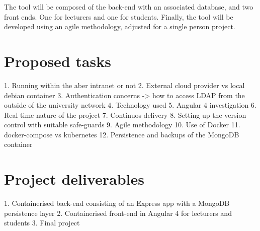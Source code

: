 \documentclass[11pt,fleqn,twoside]{article}
\begin{document}
The tool will be composed of the back-end with an associated database, and two
front ends. One for lecturers and one for students. Finally, the tool will be
developed using an agile methodology, adjusted for a single person project.

\section{Proposed tasks}
1. Running within the aber intranet or not
2. External cloud provider vs local debian container
3. Authentication concerns -> how to access LDAP from the outside of the university network
4. Technology used
5. Angular 4 investigation
6. Real time nature of the project
7. Continuos delivery
8. Setting up the version control with suitable safe-guards
9. Agile methodology
10. Use of Docker
11. docker-compose vs kubernetes
12. Persistence and backups of the MongoDB container

\section{Project deliverables}
1. Containerised back-end consisting of an Express app with a MongoDB persistence layer
2. Containerised front-end in Angular 4 for lecturers and students
3. Final project

\newpage
{}

%
%

\renewcommand{\refname}{Annotated Bibliography}  %
\end{document}
